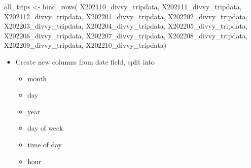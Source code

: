 \documentclass[
]{article}
\newenvironment{Shaded}{\begin{snugshade}}{\end{snugshade}}
\newcommand{\FunctionTok}[1]{\textcolor[rgb]{0.00,0.00,0.00}{#1}}
\newcommand{\NormalTok}[1]{#1}
\newcommand{\OtherTok}[1]{\textcolor[rgb]{0.56,0.35,0.01}{#1}}
\providecommand{\tightlist}{%
  \setlength{\itemsep}{0pt}\setlength{\parskip}{0pt}}
\begin{document}
\begin{Shaded}
\begin{Highlighting}[]
\NormalTok{all\_trips }\OtherTok{\textless{}{-}} \FunctionTok{bind\_rows}\NormalTok{(}
\NormalTok{                  X202110\_divvy\_tripdata, X202111\_divvy\_tripdata, X202112\_divvy\_tripdata, X202201\_divvy\_tripdata,}
\NormalTok{                  X202202\_divvy\_tripdata, X202203\_divvy\_tripdata, X202204\_divvy\_tripdata, X202205\_divvy\_tripdata,}
\NormalTok{                  X202206\_divvy\_tripdata, X202207\_divvy\_tripdata, X202208\_divvy\_tripdata, X202209\_divvy\_tripdata, }
\NormalTok{                  X202210\_divvy\_tripdata)}
\end{Highlighting}
\end{Shaded}

\fontsize{10}{12}
\selectfont

\begin{itemize}
\tightlist
\item
  Create new columns from date field, split into

  \begin{itemize}
  \tightlist
  \item
    month
  \item
    day
  \item
    year
  \item
    day of week
  \item
    time of day
  \item
    hour
  \end{itemize}
\end{itemize}

\fontsize{9}{11}
\selectfont
\end{document}
